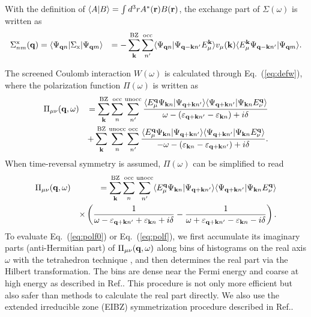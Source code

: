 \documentclass[twocolumn,showpacs,preprintnumbers,amsmath,amssymb,floatfix]{revtex4-1}
\newcommand{\bfq}{{\bf q}}
\newcommand{\bfk}{{\bf k}}
\newcommand{\bfr}{{\bf r}}
\newcommand{\ispone}{}
\newcommand{\isptwo}{}
\def\Psikn{\Psi_{{\bf k}n}}
\def\Psiqn{{\Psi_{{\bf q}n}}}
\def\Psiqm{{\Psi_{{\bf q}m}}}
\newcommand{\req}[1]{\mbox{Eq.~\!(\ref{#1})}}
\def\Psikn{{\Psi_{{\bf k}n}}}
\def\Psikn{{\Psi_{{\bf k}n}}}
\def\Psiqn{{\Psi_{{\bf q}n}}}
\def\Psikn{{\Psi_{{\bf k}n}}}
\begin{document}
\begin{widetext}
With the definition of 
$\langle A| B\rangle =\int d^3r A^*(\bfr) B(\bfr)$,
the exchange part of $\Sigma(\omega)$ is written as
\begin{eqnarray}
\Sigma^{\rm x}_{nm}(\bfq)=
\langle \Psiqn|\Sigma_{\rm x} |\Psiqm \rangle
&&=-\sum^{\rm BZ}_{{\bf k}}  \sum^{\rm  occ}_{n'}
\langle \Psiqn| \Psi_{{\bf q-k}n'} E_\mu^{\bf k} \rangle
v_{\mu}({\bf k})
\langle E_\mu^\bfk \Psi_{{\bf q-k}n'} | \Psiqm \rangle.
\label{eq:sigx}
\end{eqnarray}

The screened Coulomb interaction $W(\omega)$ is calculated
through \req{eq:defw}, where the polarization function $\Pi(\omega)$
is written as
\begin{eqnarray}
\Pi_{\mu \nu}({\bf q},\omega)
&&=
\sum^{\rm BZ}_{\bfk} \sum^{\rm occ}_{n \ispone} \sum^{\rm unocc}_{n'\isptwo}
\frac{
\langle E^{\bf q}_\mu \Psikn |\Psi_{{\bf q+k}n'} \rangle
\langle \Psi_{{\bf q+k}n'}| \Psikn E^{\bf q}_\nu \rangle
}{\omega-(\varepsilon_{{\bf q+k} n'\isptwo}-\varepsilon_{\bfk n\ispone})+i \delta} \nonumber\\
&&+ \sum^{\rm BZ}_{\bfk} \sum^{\rm  unocc}_{n \ispone} \sum^{\rm occ}_{n'\isptwo}
\frac{
\langle E^{\bf q}_\mu \Psi_{{\bf k}n} |\Psi_{{\bf q+k}n'} \rangle
\langle \Psi_{{\bf q+k}n'}| \Psi_{{\bf k}n} E^{\bf q}_\nu \rangle
}{-\omega-(\varepsilon_{\bfk n\ispone}-\varepsilon_{{\bf q+k} n'\isptwo})+i \delta}.
\label{eq:polf0}
\end{eqnarray}
When time-reversal symmetry is assumed, $\Pi(\omega)$ can be simplified to read
\begin{eqnarray}
\Pi_{\mu \nu}({\bf q},\omega)
&&=\sum^{\rm BZ}_{{\bf k}}  \sum^{\rm  occ}_{n} \sum^{\rm  unocc}_{n'}
\langle E^{\bf q}_\mu \Psi_{{\bf k}n} |\Psi_{{\bf q+k}n'} \rangle
\langle \Psi_{{\bf q+k}n'}| \Psi_{{\bf k}n} E^{\bf q}_\nu \rangle \nonumber \\
&& \times
\left(\frac{1}{\omega-\varepsilon_{{\bf q+k}n'}+\varepsilon_{{\bf k}n}+i \delta}
-\frac{1}{\omega+\varepsilon_{{\bf q+k}n'}-\varepsilon_{{\bf k}n}-i \delta}\right). \label{dieele}
\label{eq:polf}
\end{eqnarray}
To evaluate \req{eq:polf0} or \req{eq:polf},
we first accumulate its imaginary parts (anti-Hermitian part) of $\Pi_{\mu \nu}(\bfq,\omega)$
along bins of histograms on the real axis $\omega$
with the tetrahedron technique \cite{rath_generalized_1975},
and then determines the real part via the Hilbert transformation.
The bins are dense near the Fermi energy and coarse at high energy as described in 
Ref..
This procedure is not only more efficient but also safer than methods
to calculate the real part directly. 
We also use the extended irreducible zone (EIBZ) 
symmetrization procedure described in Ref.\cite{friedrich_efficient_2010}.


\end{widetext}
\end{document}
